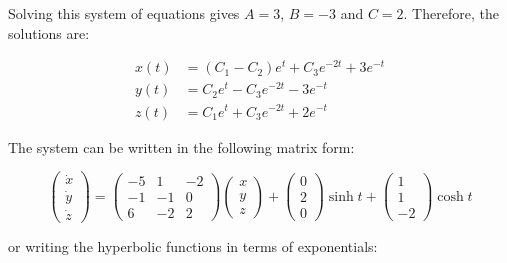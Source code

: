 \documentclass[12pt]{article}
\begin{document}
Solving this system of equations gives $A = 3$, $B = -3$ and $C = 2$. Therefore, the solutions are:

\begin{equation}
    \begin{split}
        x(t) &= (C_{1} - C_{2}) e^{t} + C_{3} e^{-2t} + 3e^{-t} \\
        y(t) &= C_{2} e^{t} - C_{3} e^{-2t} - 3e^{-t} \\
        z(t) &= C_{1} e^{t} + C_{3} e^{-2t} + 2e^{-t}
    \end{split}
\end{equation}

The system can be written in the following matrix form:

\begin{equation}
    \begin{pmatrix}
        \dot{x} \\
        \dot{y} \\
        \dot{z}
    \end{pmatrix}
    =
    \begin{pmatrix}
        -5 & 1  & -2 \\
        -1 & -1 & 0  \\
        6  & -2 & 2
    \end{pmatrix}
    \begin{pmatrix}
        x \\
        y \\
        z
    \end{pmatrix}
    +
    \begin{pmatrix}
        0 \\
        2 \\
        0
    \end{pmatrix}
    \sinh{t}
    +
    \begin{pmatrix}
        1 \\
        1 \\
        -2
    \end{pmatrix}
    \cosh{t}
\end{equation}

or writing the hyperbolic functions in terms of exponentials:
\end{document}
